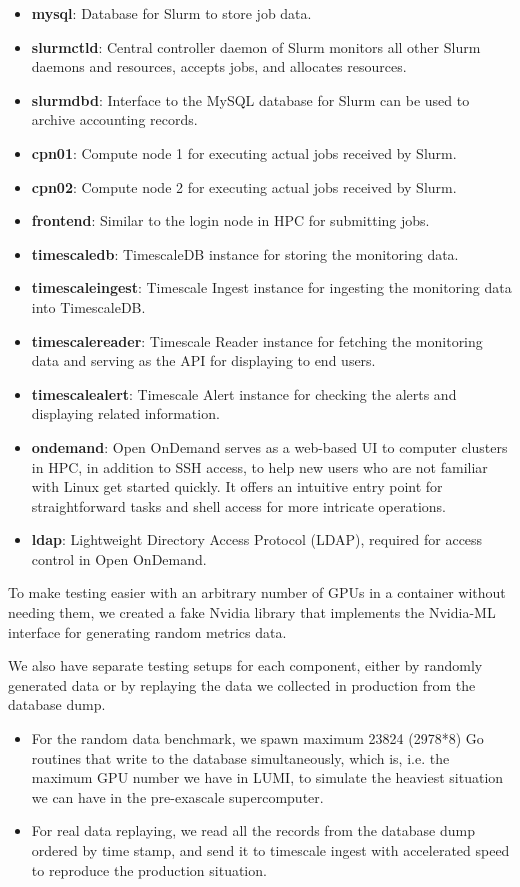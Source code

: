 \begin{itemize}
    \item \textbf{mysql}: Database for Slurm to store job data.
    \item \textbf{slurmctld}: Central controller daemon of Slurm monitors all other Slurm daemons and resources, accepts jobs, and allocates resources.
    \item \textbf{slurmdbd}: Interface to the MySQL database for Slurm can be used to archive accounting records.
    \item \textbf{cpn01}: Compute node 1 for executing actual jobs received by Slurm.
    \item \textbf{cpn02}: Compute node 2 for executing actual jobs received by Slurm.
    \item \textbf{frontend}: Similar to the login node in HPC for submitting jobs.
    \item \textbf{timescaledb}: TimescaleDB instance for storing the monitoring data.
    \item \textbf{timescaleingest}: Timescale Ingest instance for ingesting the monitoring data into TimescaleDB.
    \item \textbf{timescalereader}: Timescale Reader instance for fetching the monitoring data and serving as the API for displaying to end users.
    \item \textbf{timescalealert}: Timescale Alert instance for checking the alerts and displaying related information.
    \item \textbf{ondemand}: Open OnDemand serves as a web-based UI to computer clusters in HPC, in addition to SSH access, to help new users who are not familiar with Linux get started quickly. It offers an intuitive entry point for straightforward tasks and shell access for more intricate operations.
    \item \textbf{ldap}: Lightweight Directory Access Protocol (LDAP), required for access control in Open OnDemand.
\end{itemize}

To make testing easier with an arbitrary number of GPUs in a container without needing them, we created a fake Nvidia library that implements the Nvidia-ML interface for generating random metrics data.

We also have separate testing setups for each component, either by randomly generated data or by replaying the data we collected in production from the database dump.

\begin{itemize}
    \item For the random data benchmark, we spawn maximum 23824 (2978*8) Go routines that write to the database simultaneously, which is, i.e. the maximum GPU number we have in LUMI, to simulate the heaviest situation we can have in the pre-exascale supercomputer.
    \item For real data replaying, we read all the records from the database dump ordered by time stamp, and send it to timescale ingest with accelerated speed to reproduce the production situation.
\end{itemize}

